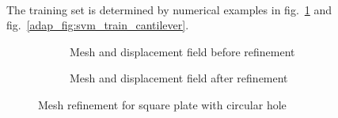 \paragraph{}
The training set is determined by numerical examples in fig.~\ref{adap_fig:svm_train_chole} and fig.~\ref{adap_fig:svm_train_cantilever}.
\begin{figure}[!ht]
    \centering
    \begin{subfigure}[b]{0.5\linewidth}
        \caption{Mesh and displacement field before refinement}
    \end{subfigure}
    \begin{subfigure}[b]{0.5\linewidth}
        \caption{Mesh and displacement field after refinement}
    \end{subfigure}
    \caption{Mesh refinement for square plate with circular hole \cite{Duval2018}}
    \label{adap_fig:svm_train_chole}
\end{figure}

